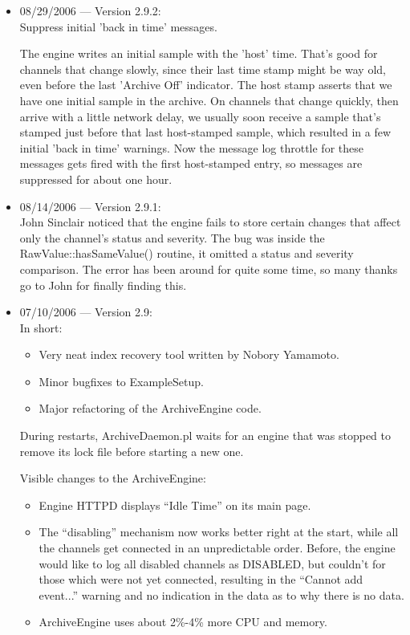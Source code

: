 \begin{itemize}
\item 08/29/2006 --- Version 2.9.2:\\
Suppress initial 'back in time' messages.

The engine writes an initial sample with the 'host' time.
That's good for channels that change slowly, since their
last time stamp might be way old, even before the last
'Archive Off' indicator. The host stamp asserts that we
have one initial sample in the archive.
On channels that change quickly, then arrive with a little
network delay, we usually soon receive a sample that's stamped
just before that last host-stamped sample, which resulted
in a few initial 'back in time' warnings.
Now the message log throttle for these messages gets fired
with the first host-stamped entry, so messages are suppressed
for about one hour.

\item 08/14/2006 --- Version 2.9.1:\\
John Sinclair noticed that the engine fails to store certain
changes that affect only the channel's status and severity.
The bug was inside the RawValue::hasSameValue() routine, it
omitted a status and severity comparison. The error has been
around for quite some time, so many thanks go to John for
finally finding this.

\item 07/10/2006 --- Version 2.9:\\
In short:
\begin{itemize}
\item Very neat index recovery tool written by Nobory Yamamoto.
\item Minor bugfixes to ExampleSetup.
\item Major refactoring of the ArchiveEngine code.
\end{itemize}

During restarts, ArchiveDaemon.pl waits for an engine that was stopped
to remove its lock file before starting a new one.

Visible changes to the ArchiveEngine:
\begin{itemize}
\item Engine HTTPD displays ``Idle Time'' on its main page.
\item The ``disabling'' mechanism now works better right at the start,
      while all the channels get connected in an unpredictable order.
      Before, the engine would like to log all disabled channels as DISABLED,
      but couldn't for those which were not yet connected,
      resulting in the ``Cannot add event...'' warning and no indication
      in the data as to why there is no data.
\item ArchiveEngine uses about 2\%-4\% more CPU and memory.
\end{itemize}


\end{itemize}
